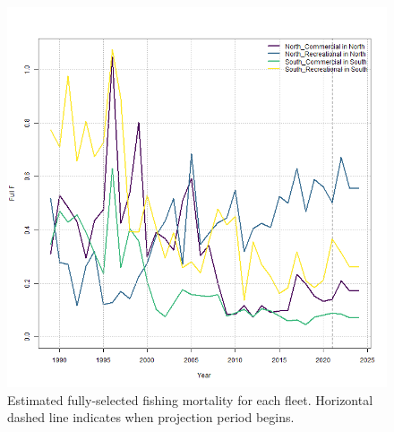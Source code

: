\documentclass[
]{article}
\begin{document}
\begin{figure}

{\centering \includegraphics[width=1\linewidth]{../2023.RT.Runs/Run34/projections/plots_png/results/F_byfleet} 

}

\caption{Estimated fully-selected fishing mortality for each fleet. Horizontal dashed line indicates when projection period begins.}\label{fig:F-by-fleet-proj}
\end{figure}
\end{document}
